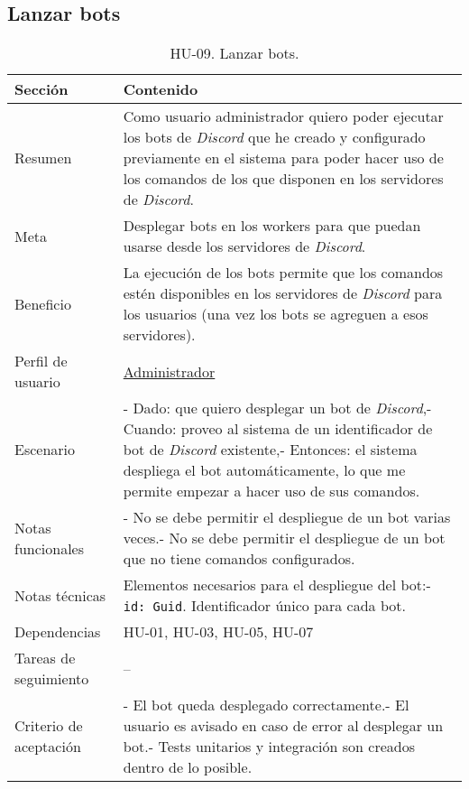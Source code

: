 \subsection{Lanzar bots}

\begin{table}[H]
    \centering
    \def\arraystretch{1.25}
    \begin{adjustbox}{max width=\textwidth}
    \begin{tabularx}{\textwidth}{l|L}
    \hline
        \textbf{Sección} & \textbf{Contenido} \\ \hline
    \hline
        Resumen & Como usuario administrador quiero poder ejecutar los bots de \textit{Discord} que he creado y configurado previamente en el sistema para poder hacer uso de los comandos de los que disponen en los servidores de \textit{Discord}. \\ \hline
        Meta & Desplegar bots en los workers para que puedan usarse desde los servidores de \textit{Discord}. \\ \hline
        Beneficio & La ejecución de los bots permite que los comandos estén disponibles en los servidores de \textit{Discord} para los usuarios (una vez los bots se agreguen a esos servidores). \\ \hline
        Perfil de usuario & \hyperref[sec:personaAdmin]{Administrador} \\ \hline
        Escenario & - Dado: que quiero desplegar un bot de \textit{Discord},\linebreak - Cuando: proveo al sistema de un identificador de bot de \textit{Discord} existente,\linebreak - Entonces: el sistema despliega el bot automáticamente, lo que me permite empezar a hacer uso de sus comandos. \\ \hline
        Notas funcionales & - No se debe permitir el despliegue de un bot varias veces.\linebreak - No se debe permitir el despliegue de un bot que no tiene comandos configurados. \\ \hline
        Notas técnicas & Elementos necesarios para el despliegue del bot:\linebreak - \verb|id: Guid|. Identificador único para cada bot. \\ \hline
        Dependencias & HU-01, HU-03, HU-05, HU-07 \\ \hline
        Tareas de seguimiento & – \\ \hline
        Criterio de aceptación & - El bot queda desplegado correctamente.\linebreak - El usuario es avisado en caso de error al desplegar un bot.\linebreak - Tests unitarios y integración son creados dentro de lo posible. \\ \hline
    \end{tabularx}
    \end{adjustbox}
    \caption{HU-09. Lanzar bots.}
\end{table}

